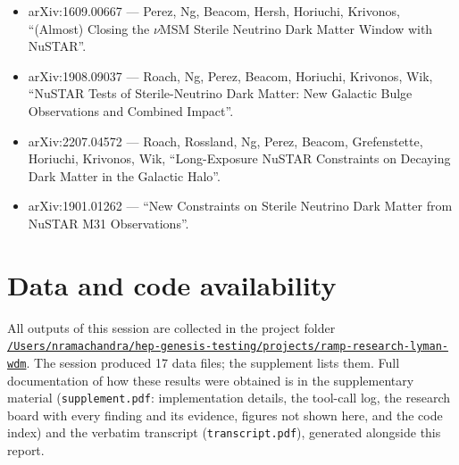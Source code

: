 \documentclass[11pt,a4paper]{article}
\begin{document}
\begin{itemize}
\item arXiv:1609.00667 --- Perez, Ng, Beacom, Hersh, Horiuchi, Krivonos, ``(Almost) Closing the $\nu$MSM Sterile Neutrino Dark Matter Window with NuSTAR''.
\item arXiv:1908.09037 --- Roach, Ng, Perez, Beacom, Horiuchi, Krivonos, Wik, ``NuSTAR Tests of Sterile-Neutrino Dark Matter: New Galactic Bulge Observations and Combined Impact''.
\item arXiv:2207.04572 --- Roach, Rossland, Ng, Perez, Beacom, Grefenstette, Horiuchi, Krivonos, Wik, ``Long-Exposure NuSTAR Constraints on Decaying Dark Matter in the Galactic Halo''.
\item arXiv:1901.01262 --- ``New Constraints on Sterile Neutrino Dark Matter from NuSTAR M31 Observations''.
\end{itemize}

\section*{Data and code availability}
All outputs of this session are collected in the project folder \href{file:///Users/nramachandra/hep-genesis-testing/projects/ramp-research-lyman-wdm}{\texttt{/\allowbreak{}Users/\allowbreak{}nramachandra/\allowbreak{}hep-genesis-testing/\allowbreak{}projects/\allowbreak{}ramp-research-lyman-wdm}}.
The session produced 17 data files; the supplement lists them.
Full documentation of how these results were obtained is in the supplementary material (\texttt{supplement.pdf}: implementation details, the tool-call log, the research board with every finding and its evidence, figures not shown here, and the code index) and the verbatim transcript (\texttt{transcript.pdf}), generated alongside this report.
\end{document}
